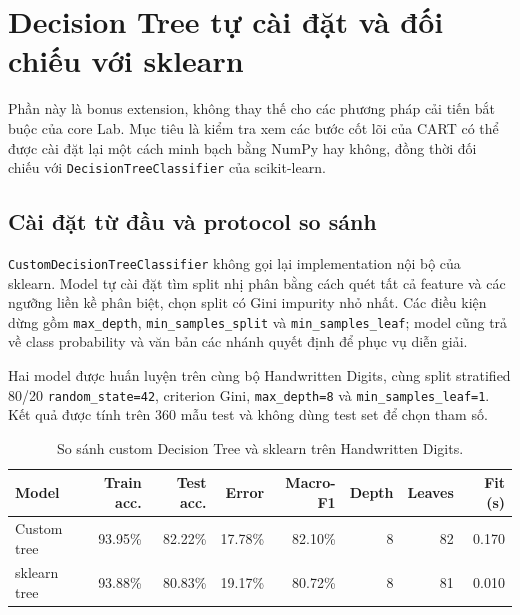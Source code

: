 \section{Decision Tree tự cài đặt và đối chiếu với sklearn}

Phần này là bonus extension, không thay thế cho các phương pháp cải tiến bắt buộc của
core Lab. Mục tiêu là kiểm tra xem các bước cốt lõi của CART có thể được cài đặt lại một
cách minh bạch bằng NumPy hay không, đồng thời đối chiếu với
\texttt{DecisionTreeClassifier} của scikit-learn.

\subsection{Cài đặt từ đầu và protocol so sánh}

\texttt{CustomDecisionTreeClassifier} không gọi lại implementation nội bộ của sklearn.
Model tự cài đặt tìm split nhị phân bằng cách quét tất cả feature và các ngưỡng liền kề
phân biệt, chọn split có Gini impurity nhỏ nhất. Các điều kiện dừng gồm
\texttt{max\_depth}, \texttt{min\_samples\_split} và \texttt{min\_samples\_leaf}; model cũng
trả về class probability và văn bản các nhánh quyết định để phục vụ diễn giải.

Hai model được huấn luyện trên cùng bộ Handwritten Digits, cùng split stratified 80/20
\texttt{random\_state=42}, criterion Gini, \texttt{max\_depth=8} và
\texttt{min\_samples\_leaf=1}. Kết quả được tính trên 360 mẫu test và không dùng test set
để chọn tham số.

\begin{table}[H]
    \centering
    \small
    \caption[So sánh custom tree và sklearn]{So sánh custom Decision Tree và sklearn trên Handwritten Digits.}
    \label{tab:custom-vs-sklearn}
    \setlength{\tabcolsep}{3.5pt}
    \begin{tabularx}{\textwidth}{@{}>{\raggedright\arraybackslash}Xrrrrrrr@{}}
        \toprule
        \textbf{Model} & \textbf{Train acc.} & \textbf{Test acc.} & \textbf{Error} &
        \textbf{Macro-F1} & \textbf{Depth} & \textbf{Leaves} & \textbf{Fit (s)} \\
        \midrule
        Custom tree & 93.95\% & 82.22\% & 17.78\% & 82.10\% & 8 & 82 & 0.170 \\
        sklearn tree & 93.88\% & 80.83\% & 19.17\% & 80.72\% & 8 & 81 & 0.010 \\
        \bottomrule
    \end{tabularx}
\end{table}

